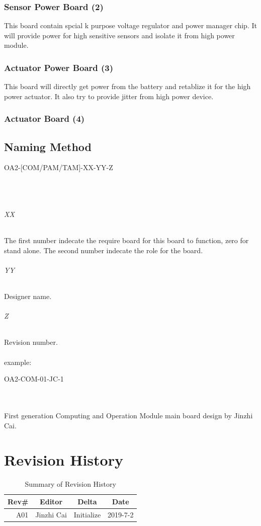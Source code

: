 \documentclass[12pt,article]{memoir}
\begin{document}
\subsection{Sensor Power Board (2)}
This board contain spcial k purpose voltage regulator and power manager chip. It will provide power for high sensitive sensors and isolate it from high power module.
\subsection{Actuator Power Board (3)}
This board will directly get power from the battery and retablize it for the high power actuator. It also try to provide jitter from high power device.
\subsection{Actuator Board (4)}
\newpage
\section{Naming Method}
\begin{LARGE}
OA2-[COM/PAM/TAM]-XX-YY-Z
\end{LARGE}\\\\
\subparagraph{XX}
The first number indecate the require board for this board to function, zero for stand alone. The second number indecate the role for the board.
\subparagraph{YY}
Designer name.
\subparagraph{Z}
Revision number.\\\\
example: 
\begin{large}
OA2-COM-01-JC-1
\end{large}\\\\
First generation Computing and Operation Module main board design by Jinzhi Cai.
\newpage
\chapter{Revision History}
\begin{table}[H]
	\centering
	\begin{tabu}{r || c | c | c }
		Rev\# & Editor & Delta & Date\\ \hline
		A01 & Jinzhi Cai & Initialize  & 2019-7-2\\ \hline
	\end{tabu}
	\caption{Summary of Revision History}
	\label{tab:edatools}
\end{table}
\end{document}
